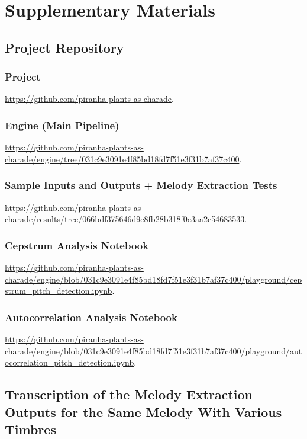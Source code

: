 \section{Supplementary Materials}
\label{sec:supplementary}

\subsection{Project Repository}
\label{sec:code}

\subsubsection{Project} \url{https://github.com/piranha-plants-as-charade}.
\subsubsection{Engine (Main Pipeline)} \url{https://github.com/piranha-plants-as-charade/engine/tree/031c9e3091e4f85bd18fd7f51e3f31b7af37c400}.
\subsubsection{Sample Inputs and Outputs + Melody Extraction Tests} \url{https://github.com/piranha-plants-as-charade/results/tree/066bdf375646d9c8fb28b318f0c3aa2c54683533}.
\subsubsection{Cepstrum Analysis Notebook} \url{https://github.com/piranha-plants-as-charade/engine/blob/031c9e3091e4f85bd18fd7f51e3f31b7af37c400/playground/cepstrum_pitch_detection.ipynb}.
\subsubsection{Autocorrelation Analysis Notebook} \url{https://github.com/piranha-plants-as-charade/engine/blob/031c9e3091e4f85bd18fd7f51e3f31b7af37c400/playground/autocorrelation_pitch_detection.ipynb}.

\clearpage
\subsection{Transcription of the Melody Extraction Outputs for the Same Melody With Various Timbres}
\label{sec:sheet_music_melody}

